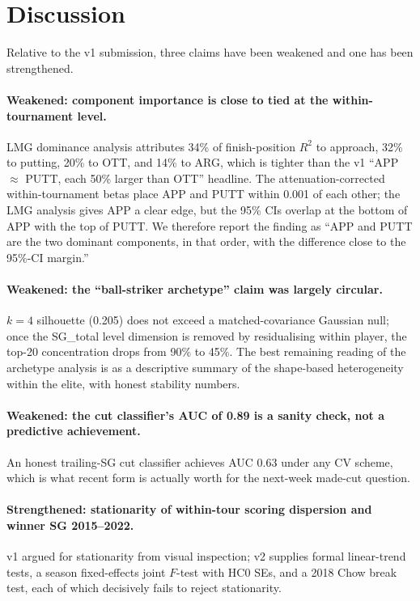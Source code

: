 \documentclass[11pt]{article}
\begin{document}
\section{Discussion}

Relative to the v1 submission, three claims have been weakened and one has been strengthened.

\paragraph{Weakened: component importance is close to tied at the within-tournament level.}  LMG dominance analysis attributes 34\% of finish-position $R^2$ to approach, 32\% to putting, 20\% to OTT, and 14\% to ARG, which is tighter than the v1 ``APP $\approx$ PUTT, each 50\% larger than OTT'' headline.  The attenuation-corrected within-tournament betas place APP and PUTT within 0.001 of each other; the LMG analysis gives APP a clear edge, but the 95\% CIs overlap at the bottom of APP with the top of PUTT.  We therefore report the finding as ``APP and PUTT are the two dominant components, in that order, with the difference close to the 95\%-CI margin.''

\paragraph{Weakened: the ``ball-striker archetype'' claim was largely circular.}  $k=4$ silhouette (0.205) does not exceed a matched-covariance Gaussian null; once the SG\_total level dimension is removed by residualising within player, the top-20 concentration drops from 90\% to 45\%.  The best remaining reading of the archetype analysis is as a descriptive summary of the shape-based heterogeneity within the elite, with honest stability numbers.

\paragraph{Weakened: the cut classifier's AUC of 0.89 is a sanity check, not a predictive achievement.}  An honest trailing-SG cut classifier achieves AUC 0.63 under any CV scheme, which is what recent form is actually worth for the next-week made-cut question.

\paragraph{Strengthened: stationarity of within-tour scoring dispersion and winner SG 2015--2022.}  v1 argued for stationarity from visual inspection; v2 supplies formal linear-trend tests, a season fixed-effects joint $F$-test with HC0 SEs, and a 2018 Chow break test, each of which decisively fails to reject stationarity.
\end{document}
